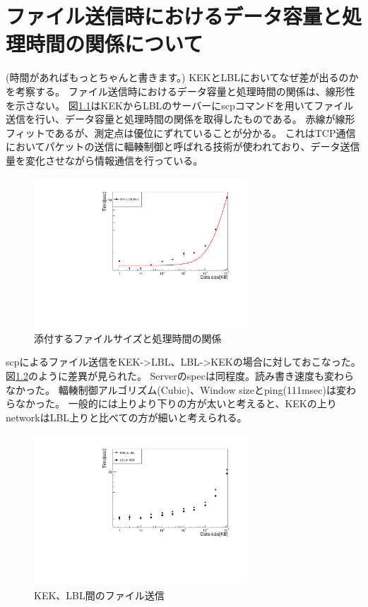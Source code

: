 \chapter{ファイル送信時におけるデータ容量と処理時間の関係について}

(時間があればもっとちゃんと書きます。)
KEKとLBLにおいてなぜ差が出るのかを考察する。
ファイル送信時におけるデータ容量と処理時間の関係は、線形性を示さない。
図\ref{datasize_vs_time_scp}はKEKからLBLのサーバーにscpコマンドを用いてファイル送信を行い、データ容量と処理時間の関係を取得したものである。
赤線が線形フィットであるが、測定点は優位にずれていることが分かる。
これはTCP通信においてパケットの送信に輻輳制御と呼ばれる技術が使われており、データ送信量を変化させながら情報通信を行っている。

\begin{figure}[bpt]\centering
  \begin{center}
    \includegraphics[width=8cm,angle=270]{datasize_vs_time_scp.pdf}
  \caption[添付するファイルサイズと処理時間の関係]{添付するファイルサイズと処理時間の関係}
  \label{datasize_vs_time_scp}
  \end{center}
\end{figure}

scpによるファイル送信をKEK->LBL、LBL->KEKの場合に対しておこなった。図\ref{datasize_vs_time_kek_lbl}のように差異が見られた。
Serverのspecは同程度。読み書き速度も変わらなかった。
輻輳制御アルゴリズム(Cubic)、Window sizeとping(111msec)は変わらなかった。
一般的には上りより下りの方が太いと考えると、KEKの上りnetworkはLBL上りと比べての方が細いと考えられる。
\begin{figure}[bpt]\centering
  \begin{center}
    \includegraphics[width=8cm,angle=270]{scp_kek_lbl.pdf}
  \caption[KEK、LBL間のファイル送信]{KEK、LBL間のファイル送信}
  \label{datasize_vs_time_kek_lbl}
  \end{center}
\end{figure}

